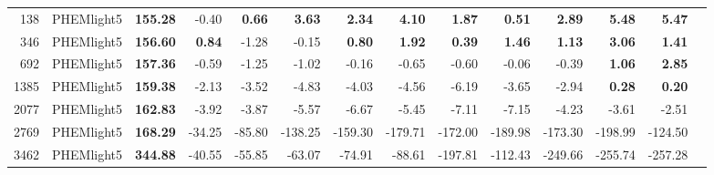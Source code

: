 \begin{table}[htb]
{\begin{tabular}{r l *{12}{r}}
      138  & PHEMlight5 & \textbf{155.28}       & -0.40   & \textbf{0.66}    & \textbf{3.63}      & \textbf{2.34}      & \textbf{4.10}      & \textbf{1.87}        & \textbf{0.51}    & \textbf{2.89}      & \textbf{5.48}      & \textbf{5.47}      \\
      346  & PHEMlight5 & \textbf{156.60}       & \textbf{0.84}    & -1.28   & -0.15     & \textbf{0.80}      & \textbf{1.92}      & \textbf{0.39}        & \textbf{1.46}    & \textbf{1.13}      & \textbf{3.06}      & \textbf{1.41}      \\
      692  & PHEMlight5 & \textbf{157.36}       & -0.59   & -1.25   & -1.02     & -0.16     & -0.65     & -0.60       & -0.06   & -0.39     & \textbf{1.06}      & \textbf{2.85}      \\
      1385 & PHEMlight5 & \textbf{159.38}       & -2.13   & -3.52   & -4.83     & -4.03     & -4.56     & -6.19       & -3.65   & -2.94     & \textbf{0.28}      & \textbf{0.20}      \\
      2077 & PHEMlight5 & \textbf{162.83}       & -3.92   & -3.87   & -5.57     & -6.67     & -5.45     & -7.11       & -7.15   & -4.23     & -3.61     & -2.51     \\
      2769 & PHEMlight5 & \textbf{168.29}       & -34.25  & -85.80  & -138.25   & -159.30   & -179.71   & -172.00     & -189.98 & -173.30   & -198.99   & -124.50   \\
      3462 & PHEMlight5 & \textbf{344.88}       & -40.55  & -55.85  & -63.07    & -74.91    & -88.61    & -197.81     & -112.43 & -249.66   & -255.74   & -257.28   \\
      \bottomrule
    \end{tabular}%
  }
\end{table}

